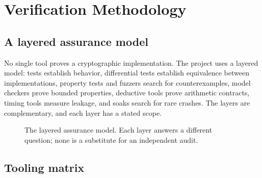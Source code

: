 \documentclass[11pt,a4paper]{article}
\begin{document}
\section{Verification Methodology}

\subsection{A layered assurance model}

No single tool proves a cryptographic implementation. The project uses a
layered model: tests establish behavior, differential tests establish
equivalence between implementations, property tests and fuzzers search for
counterexamples, model checkers prove bounded properties, deductive tools prove
arithmetic contracts, timing tools measure leakage, and soaks search for
rare crashes. The layers are complementary, and each layer has a stated scope.

\begin{figure}[ht]
\centering
{}
\caption{The layered assurance model. Each layer answers a different question;
none is a substitute for an independent audit.}
\label{fig:assurance}
\end{figure}

\subsection{Tooling matrix}
\end{document}
